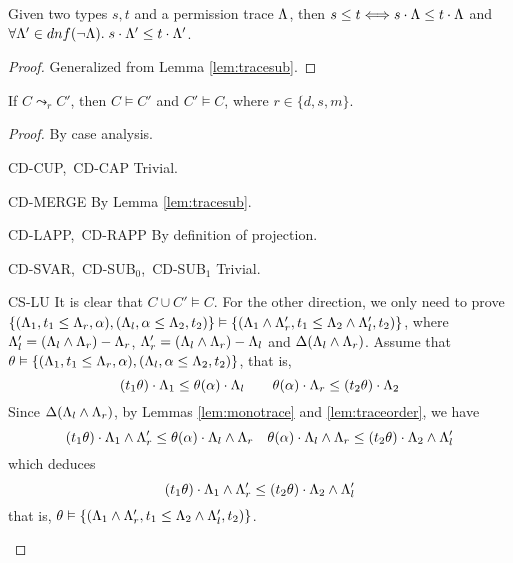 {{{%


\begin{lemma}\label{lem:tracesub1}
Given two types $s,t$ and a permission trace $\Lambda$, then
$s\leq t\Longleftrightarrow s\cdot\Lambda \leq t\cdot\Lambda$ and $\forall \Lambda' \in dnf(\neg\Lambda).\; s\cdot \Lambda' \leq t\cdot\Lambda'$.
\end{lemma}
\begin{proof}
Generalized from Lemma \ref{lem:tracesub}.
\end{proof}


\begin{lemma}\label{lem:consolcorrect}
If $C\leadsto_{r} C'$, then $C\vDash C'$ and $C' \vDash C$, where $r\in \{d,s,m\}$.
\end{lemma}

\begin{proof} By case analysis.
\begin{ProofEnumDesc}
\item[CD-CUP,~CD-CAP] Trivial.
\item[CD-MERGE]
By Lemma \ref{lem:tracesub}.
\item[CD-LAPP,~CD-RAPP] By definition of projection.
\item[CD-SVAR,~CD-SUB$_0$,~CD-SUB$_1$] Trivial.
\item[CS-LU]
It is clear that $C\cup C' \vDash C$.
For the other direction, we only need to prove
$\{(\Lambda_1, t_1 \leq \Lambda_r, \alpha ),(\Lambda_l, \alpha \leq \Lambda_2, t_2)\} \vDash
\{(\Lambda_1\land\Lambda'_r, t_1\leq \Lambda_2\land\Lambda'_l, t_2) \}$, where $\Lambda'_l = (\Lambda_l\land \Lambda_r)  - \Lambda_r$, $\Lambda'_r =(\Lambda_l\land \Lambda_r) - \Lambda_l$ and $\Delta(\Lambda_l\land\Lambda_r)$.
Assume that $\theta \vDash  \{(\Lambda_1, t_1 \leq \Lambda_r, \alpha ),(\Lambda_l, \alpha \leq \Lambda_2, t_2)\} $, that is,
\begin{equation*}
 (t_1\theta)\cdot\Lambda_{1} \leq \theta(\alpha)\cdot\Lambda_{l}
\quad\quad
 \theta(\alpha)\cdot\Lambda_{r} \leq (t_2\theta)\cdot\Lambda_{2}
\end{equation*}
Since $\Delta(\Lambda_l\land\Lambda_r)$, by Lemmas \ref{lem:monotrace} and \ref{lem:traceorder}, we have
\begin{equation*}
 (t_1\theta)\cdot\Lambda_{1} \land\Lambda'_r \leq \theta(\alpha)\cdot\Lambda_{l}\land\Lambda_r
\quad
 \theta(\alpha)\cdot\Lambda_{l}\land\Lambda_r \leq (t_2\theta)\cdot\Lambda_{2} \land\Lambda'_l
\end{equation*}
which deduces
\begin{equation*}
(t_1\theta)\cdot\Lambda_{1} \land\Lambda'_r \leq (t_2\theta)\cdot\Lambda_{2} \land\Lambda'_l
\end{equation*}
that is, $\theta \vDash \{(\Lambda_1\land\Lambda'_r, t_1\leq \Lambda_2\land\Lambda'_l, t_2) \}$.


\end{ProofEnumDesc}
\end{proof}}}}
